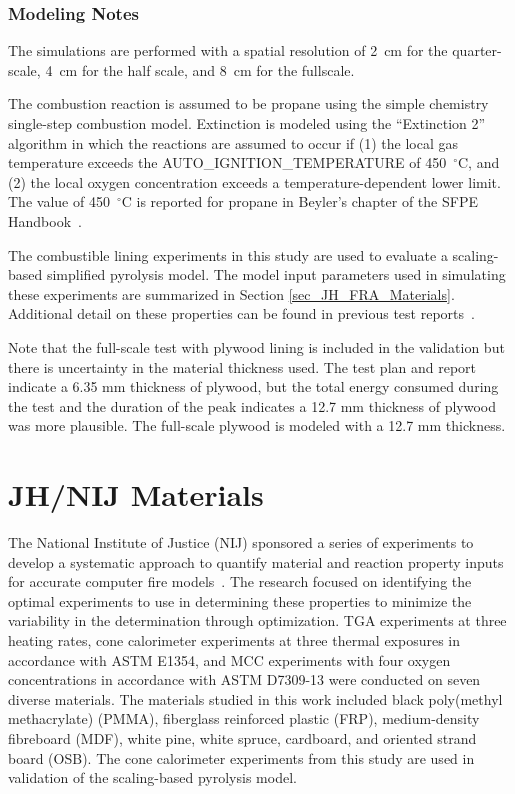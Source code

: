 \FloatBarrier

\subsubsection{Modeling Notes}

The simulations are performed with a spatial resolution of 2~cm for the quarter-scale, 4~cm for the half scale, and 8~cm for the fullscale.

The combustion reaction is assumed to be propane using the simple chemistry single-step combustion model.
Extinction is modeled using the ``Extinction 2'' algorithm in which the reactions are assumed to occur if (1) the local gas temperature exceeds the {\ct AUTO\_IGNITION\_TEMPERATURE} of 450~$^\circ$C, and (2) the local oxygen concentration exceeds a temperature-dependent lower limit. The value of 450~$^\circ$C is reported for propane in Beyler's chapter of the SFPE Handbook~\cite{SFPE:Beyler}.

The combustible lining experiments in this study are used to evaluate a scaling-based simplified pyrolysis model.
The model input parameters used in simulating these experiments are summarized in Section \ref{sec_JH_FRA_Materials}.
Additional detail on these properties can be found in previous test reports~\cite{Luo:FRA2019,Lattimer:NIJ19}.

Note that the full-scale test with plywood lining is included in the validation but there is uncertainty in the material thickness used.
The test plan and report indicate a 6.35 mm thickness of plywood, but the total energy consumed during the test and the duration of the peak indicates a 12.7 mm thickness of plywood was more plausible.
The full-scale plywood is modeled with a 12.7 mm thickness.

\FloatBarrier

\section{JH/NIJ Materials}
\label{JH_NIJ_Description}


The National Institute of Justice (NIJ) sponsored a series of experiments to develop a systematic approach to quantify material and reaction property inputs for accurate computer fire models~\cite{Lattimer:NIJ19}.
The research focused on identifying the optimal experiments to use in determining these properties to minimize the variability in the determination through optimization.
TGA experiments at three heating rates, cone calorimeter experiments at three thermal exposures in accordance with ASTM E1354, and MCC experiments with four oxygen concentrations in accordance with ASTM D7309-13 were conducted on seven diverse materials.
The materials studied in this work included black poly(methyl methacrylate) (PMMA), fiberglass reinforced plastic (FRP), medium-density fibreboard (MDF), white pine, white spruce, cardboard, and oriented strand board (OSB).
The cone calorimeter experiments from this study are used in validation of the scaling-based pyrolysis model.


